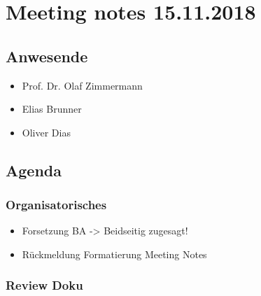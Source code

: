 \hypertarget{meeting-notes-15.11.2018}{%
\section*{Meeting notes 15.11.2018}\label{meeting-notes-15.11.2018}}

\hypertarget{anwesende}{%
\subsection*{Anwesende}\label{anwesende}}

\begin{itemize}

\item
  Prof. Dr. Olaf Zimmermann
\item
  Elias Brunner
\item
  Oliver Dias
\end{itemize}

\hypertarget{agenda}{%
\subsection*{Agenda}\label{agenda}}

\hypertarget{organisatorisches}{%
\subsubsection*{Organisatorisches}\label{organisatorisches}}

\begin{itemize}

\item
  Forsetzung BA -\textgreater{} Beidseitig zugesagt!
\item
  Rückmeldung Formatierung Meeting Notes
\end{itemize}

\hypertarget{review-doku}{%
\subsubsection*{Review Doku}\label{review-doku}}

